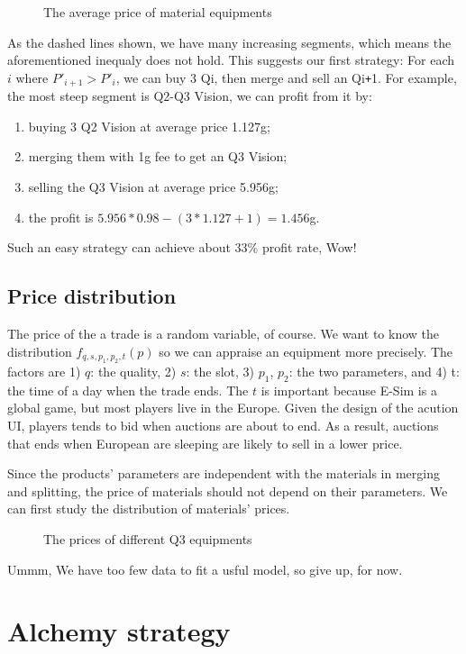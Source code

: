 \documentclass{manuscript}
\begin{document}
    \begin{figure}[ht]
        \centering
        
        \caption{The average price of material equipments}\label{fig:reg_price_quality}
    \end{figure}

    As the dashed lines shown, we have many increasing segments, which means the aforementioned inequaly does not hold.
    This suggests our first strategy: For each $i$ where $P'_{i+1} > P'_i$, we can buy 3 Qi, then merge and sell an
    Qi\verb!+!1. For example, the most steep segment is Q2-Q3 Vision, we can profit from it by:
    \begin{enumerate}[nosep]
        \item buying 3 Q2 Vision at average price 1.127g;
        \item merging them with 1g fee to get an Q3 Vision;
        \item selling the Q3 Vision at average price 5.956g;
        \item the profit is $5.956 * 0.98 - (3 * 1.127 + 1) = 1.456$g.
    \end{enumerate}
    Such an easy strategy can achieve about 33\% profit rate, Wow!

    \subsection{Price distribution}

    The price of the a trade is a random variable, of course. We want to know the distribution $f_{q, s, p_1, p_2, t}(p)$ so
    we can appraise an equipment more precisely. The factors are 1) $q$: the quality, 2) $s$: the slot, 3) $p_1$, $p_2$:
    the two parameters, and 4) t: the time of a day when the trade ends. The $t$ is important because E-Sim is a global
    game, but most players live in the Europe. Given the design of the acution UI, players tends to bid when auctions are
    about to end. As a result, auctions that ends when European are sleeping are likely to sell in a lower price.

    Since the products' parameters are independent with the materials in merging and splitting, the price of materials
    should not depend on their parameters. We can first study the distribution of materials' prices.

    \begin{figure}[ht]
        \centering
        
        \caption{The prices of different Q3 equipments}\label{fig:hist_material_price}
    \end{figure}

    Ummm, We have too few data to fit a usful model, so give up, for now.

    \section{Alchemy strategy}
\end{document}
